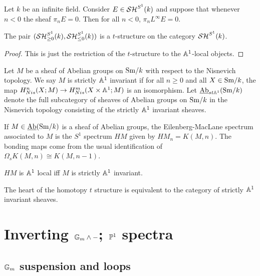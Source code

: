 \documentclass{amsart}%
\begin{document}
\begin{theorem}
  Let $k$ be an infinite field. Consider $E \in \mathcal{SH}^{S^1}(k)$ and
  suppose that whenever $n < 0$ the sheaf $\pi_n E = 0$. Then for all
  $n<0$, $\pi_n L^{\infty}E = 0$.
\end{theorem}

\begin{theorem}
  The pair $(\mathcal{SH}_{\geq 0}^{S^1}(k), \mathcal{SH}_{\leq 0}^{S^1}(k))$ is a
  $t$-structure on the category $\mathcal{SH}^{S^1}(k)$. 
\end{theorem}

\begin{proof}
  This is just the restriction of the $t$-structure to the
  $\mathbb{A}^1$-local objects.
\end{proof}

\begin{definition}
  Let $M$ be a sheaf of Abelian groups on $\mathrm{Sm}/k$ with respect to the
  Nisnevich topology. We say $M$ is strictly $\mathbb{A}^1$ invariant if for
  all $n\geq 0$ and all $X \in \mathrm{Sm}/k$, the map
  $H^n_{Nis}(X; M) \to H^m_{Nis}(X\times \mathbb{A}^1; M)$ is an
  isomorphism. Let $\operatorname{\underline{Ab}}_{st\mathbb{A}^1}(\mathrm{Sm}/k)$ denote the full subcategory
  of sheaves of Abelian groups on $\mathrm{Sm}/k$ in the Nisnevich topology
  consisting of the strictly $\mathbb{A}^1$ invariant sheaves.
\end{definition}

\begin{definition}
  If $M\in\operatorname{\underline{Ab}}(\mathrm{Sm}/k)$ is a sheaf of Abelian groups, the
  Eilenberg-MacLane spectrum associated to $M$ is the $S^1$ spectrum
  $HM$ given by $HM_n = K(M,n)$. The bonding maps come from the usual
  identification of $\Omega_s K(M,n) \cong K(M,n-1)$. 
\end{definition}

\begin{proposition}
  $HM$ is $\mathbb{A}^1$ local iff $M$ is strictly $\mathbb{A}^1$ invariant.
\end{proposition}

\begin{proposition}
  The heart of the homotopy $t$ structure is equivalent to the
  category of strictly $\mathbb{A}^1$ invariant sheaves.
\end{proposition}

\section{Inverting $\mathbb{G}_m\wedge -$; $\mathbb{P}^1$ spectra}

\subsection{$\mathbb{G}_m$ suspension and loops}
\end{document}
